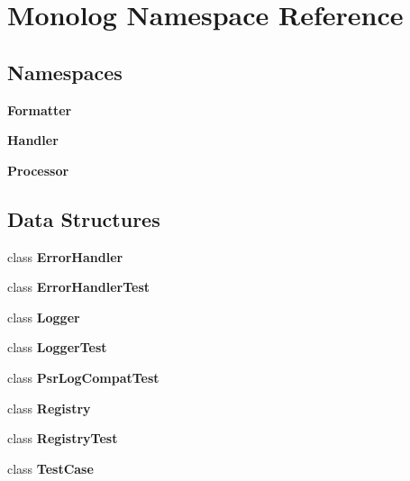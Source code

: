 \section{Monolog Namespace Reference}
\label{namespace_monolog}
\subsection*{Namespaces}
\begin{DoxyCompactItemize}
\item 
 {\bf Formatter}
\item 
 {\bf Handler}
\item 
 {\bf Processor}
\end{DoxyCompactItemize}
\subsection*{Data Structures}
\begin{DoxyCompactItemize}
\item 
class {\bf Error\+Handler}
\item 
class {\bf Error\+Handler\+Test}
\item 
class {\bf Logger}
\item 
class {\bf Logger\+Test}
\item 
class {\bf Psr\+Log\+Compat\+Test}
\item 
class {\bf Registry}
\item 
class {\bf Registry\+Test}
\item 
class {\bf Test\+Case}
\end{DoxyCompactItemize}
